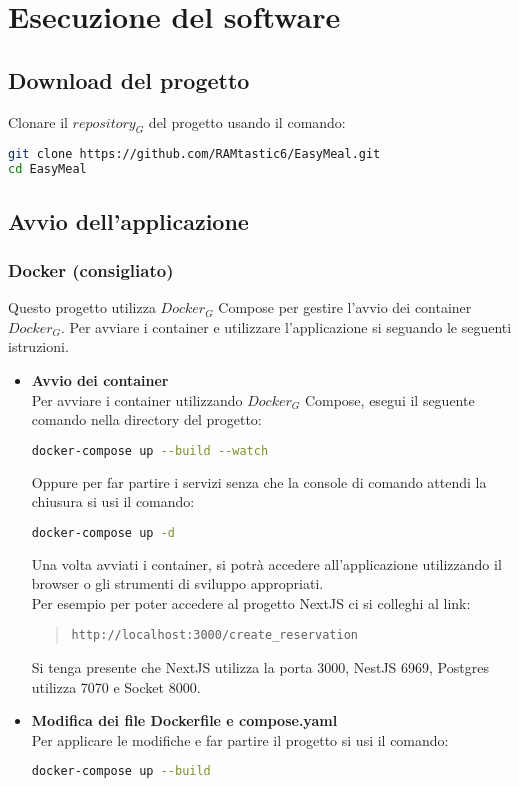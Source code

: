 \section{Esecuzione del software}
\subsection{Download del progetto}
Clonare il $\textit{repository}_G$ del progetto usando il comando: 
\begin{lstlisting}[language=bash]
git clone https://github.com/RAMtastic6/EasyMeal.git 
cd EasyMeal
\end{lstlisting}

\subsection{Avvio dell'applicazione} 
\subsubsection{Docker (consigliato)}
Questo progetto utilizza $\textit{Docker}_G$ Compose per gestire l'avvio dei container $\textit{Docker}_G$. 
Per avviare i container e utilizzare l'applicazione si seguando le seguenti istruzioni.

\begin{itemize}
\item \textbf{Avvio dei container} \\
Per avviare i container utilizzando $\textit{Docker}_G$ Compose, esegui il seguente comando nella directory del progetto:
\begin{lstlisting}[language=bash]
docker-compose up --build --watch
\end{lstlisting}

Oppure per far partire i servizi senza che la console di comando attendi la chiusura si usi il comando:
\begin{lstlisting}[language=bash]
docker-compose up -d
\end{lstlisting}

Una volta avviati i container, si potrà accedere all'applicazione utilizzando il browser o gli strumenti di sviluppo appropriati. \\ Per esempio per poter accedere al progetto NextJS ci si colleghi al link: 
\begin{quote}
\begin{verbatim}
http://localhost:3000/create_reservation 
\end{verbatim}
\end{quote}
Si tenga presente che NextJS utilizza la porta 3000, NestJS 6969, Postgres utilizza 7070 e Socket 8000.
\\
\item \textbf{Modifica dei file Dockerfile e compose.yaml} \\
Per applicare le modifiche e far partire il progetto si usi il comando:
\begin{lstlisting}[language=bash]
docker-compose up --build
\end{lstlisting}

\end{itemize}

